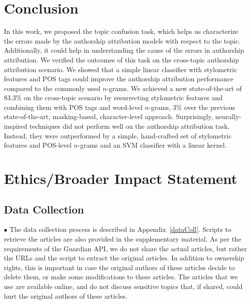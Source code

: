 \documentclass[11pt]{article}
\begin{document}

\section{Conclusion}
In this work, we proposed the topic confusion task, which helps us characterize the errors made by the authorship attribution models with respect to the topic. Additionally, it could help in understanding the cause of the errors in authorship attribution. We verified the outcomes of this task on the cross-topic authorship attribution scenario. We showed that a simple linear classifier with stylometric features and POS tags could improve the authorship attribution performance compared to the commonly used $n$-grams. We achieved a new state-of-the-art of 83.3\% on the cross-topic scenario by resurrecting stylometric features and combining them with POS tags and word-level $n$-grams, 3\% over the previous state-of-the-art, masking-based, character-level approach. Surprisingly, neurally-inspired techniques did not perform well on the authorship attribution task. Instead, they were outperformed by a simple, hand-crafted set of stylometric features and POS-level $n$-grams and an SVM classifier with a linear kernel. 


\newpage
\section{Ethics/Broader Impact Statement}
\subsection{Data Collection}
\noindent$\bullet$ The data collection process is described in Appendix~\ref{dataColl}. Scripts to retrieve the articles are also provided in the supplementary material. As per the requirements of the Guardian API, we do not share the actual articles, but rather the URLs and the script to extract the original articles. In addition to ownership rights, this is important in case the original authors of these articles decide to delete them, or make some modifications to these articles. The articles that we use are available online, and do not discuss sensitive topics that, if shared, could hurt the original authors of these articles. 
\end{document}
